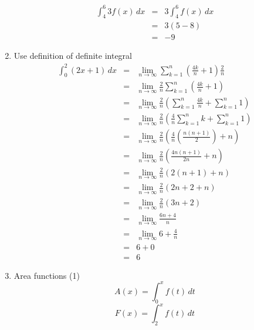 \documentclass{article}
\begin{document}
\begin{enumerate}
\begin{eqnarray}
            \int_4^6{3f(x)\,dx} &=& 3\int_4^6{f(x)\,dx} \\
                                &=& 3\left(5 - 8\right) \\
                                &=& -9
        \end{eqnarray}
    \item Use definition of definite integral
        \begin{eqnarray}
            \int_0^2{\left(2x + 1\right)\,dx} &=& \lim_{n \to \infty}{\sum_{k = 1}^n{\left(\frac{4k}{n} + 1\right)\frac{2}{n}}} \\
                                              &=& \lim_{n \to \infty}{\frac{2}{n}\sum_{k = 1}^n{\left(\frac{4k}{n} + 1\right)}} \\
                                              &=& \lim_{n \to \infty}{\frac{2}{n}\left(\sum_{k = 1}^n{\frac{4k}{n}} + \sum_{k = 1}^n{1}\right)} \\
                                              &=& \lim_{n \to \infty}{\frac{2}{n}\left(\frac{4}{n}\sum_{k = 1}^n{k} + \sum_{k = 1}^n{1}\right)} \\
                                              &=& \lim_{n \to \infty}{\frac{2}{n}\left(\frac{4}{n}\left(\frac{n(n + 1)}{2}\right) + n\right)} \\
                                              &=& \lim_{n \to \infty}{\frac{2}{n}\left(\frac{4n(n + 1)}{2n} + n\right)} \\
                                              &=& \lim_{n \to \infty}{\frac{2}{n}\left(2(n + 1) + n\right)} \\
                                              &=& \lim_{n \to \infty}{\frac{2}{n}\left(2n + 2 + n\right)} \\
                                              &=& \lim_{n \to \infty}{\frac{2}{n}\left(3n + 2\right)} \\
                                              &=& \lim_{n \to \infty}{\frac{6n + 4}{n}} \\
                                              &=& \lim_{n \to \infty}{6 + \frac{4}{n}} \\
                                              &=& 6 + 0 \\
                                              &=& 6
        \end{eqnarray}
    \item Area functions (1)
        $$A(x) = \int_0^x{f(t)\,dt}$$
        $$F(x) = \int_2^x{f(t)\,dt}$$
        \begin{eqnarray}

\end{eqnarray}
\end{enumerate}
\end{document}
